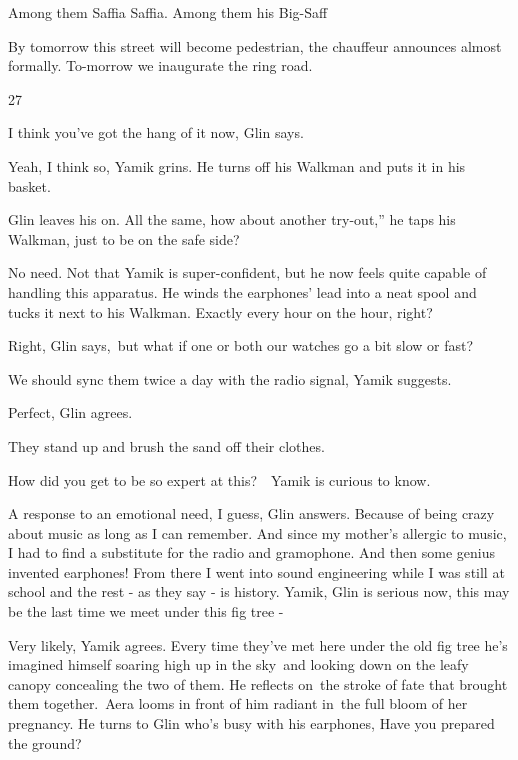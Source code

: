 \documentclass[letterpaper]{article}
\begin{document}
Among them Saffia Saffia. Among them his Big-Saff

{\textquotedbl}By tomorrow this street will become pedestrian,{\textquotedbl} the chauffeur announces almost formally.
{\textquotedbl}To-morrow we inaugurate the ring road.{\textquotedbl} 


\bigskip

27 

{\textquotedbl}I think you've got the hang of it now,{\textquotedbl} Glin says.

{\textquotedbl}Yeah, I think so,{\textquotedbl} Yamik grins. He turns off his Walkman and puts it in his basket.

Glin leaves his on. {\textquotedbl}All the same, how about another try-out,'' he taps his Walkman, {\textquotedbl}just
to be on the safe side?{\textquotedbl} 

{\textquotedbl}No need.{\textquotedbl} Not that Yamik is super-confident, but he now feels quite capable of handling
this apparatus. He winds the earphones' lead into a neat spool and tucks it next to his Walkman. {\textquotedbl}Exactly
every hour on the hour, right?{\textquotedbl} 

{\textquotedbl}Right,{\textquotedbl} Glin says,\ {\textquotedbl}but what if one or both our watches go a bit slow or
fast?{\textquotedbl} 

{\textquotedbl}We should sync them twice a day with the radio signal,{\textquotedbl} Yamik suggests. 

{\textquotedbl}Perfect,{\textquotedbl} Glin agrees.

They stand up and brush the sand off their clothes. 

{\textquotedbl}How did you get to be so expert at this?{\textquotedbl}\ \ Yamik is curious to know.

{\textquotedbl}A response to an emotional need, I guess,{\textquotedbl} Glin answers. {\textquotedbl}Because of being
crazy about music as long as I can remember. And since my mother's allergic to music, I had to find a substitute for
the radio and gramophone. And then some genius invented earphones! From there I went into sound engineering while I was
still at school and the rest - as they say - is history. Yamik,{\textquotedbl} Glin is serious now, {\textquotedbl}this
may be the last time we meet under this fig tree -{\textquotedbl}

{\textquotedbl}Very likely,{\textquotedbl} Yamik agrees. Every time they've met here under the old fig tree he's
imagined himself soaring high up in the sky~and looking down on the leafy canopy concealing the two of them. He
reflects on~the stroke of fate that brought them together.\  Aera looms in front of him radiant in~the full bloom of
her pregnancy. He turns to Glin who's busy with his earphones, {\textquotedbl}Have you prepared the
ground?{\textquotedbl}
\end{document}
